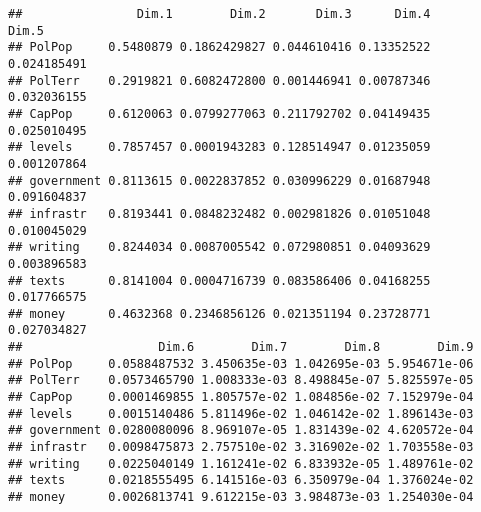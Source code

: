\documentclass[
]{article}
\newenvironment{Shaded}{\begin{snugshade}}{\end{snugshade}}
\newcommand{\NormalTok}[1]{#1}
\newcommand{\OperatorTok}[1]{\textcolor[rgb]{0.81,0.36,0.00}{\textbf{#1}}}
\begin{document}
\begin{verbatim}
##                Dim.1        Dim.2       Dim.3      Dim.4       Dim.5
## PolPop     0.5480879 0.1862429827 0.044610416 0.13352522 0.024185491
## PolTerr    0.2919821 0.6082472800 0.001446941 0.00787346 0.032036155
## CapPop     0.6120063 0.0799277063 0.211792702 0.04149435 0.025010495
## levels     0.7857457 0.0001943283 0.128514947 0.01235059 0.001207864
## government 0.8113615 0.0022837852 0.030996229 0.01687948 0.091604837
## infrastr   0.8193441 0.0848232482 0.002981826 0.01051048 0.010045029
## writing    0.8244034 0.0087005542 0.072980851 0.04093629 0.003896583
## texts      0.8141004 0.0004716739 0.083586406 0.04168255 0.017766575
## money      0.4632368 0.2346856126 0.021351194 0.23728771 0.027034827
##                   Dim.6        Dim.7        Dim.8        Dim.9
## PolPop     0.0588487532 3.450635e-03 1.042695e-03 5.954671e-06
## PolTerr    0.0573465790 1.008333e-03 8.498845e-07 5.825597e-05
## CapPop     0.0001469855 1.805757e-02 1.084856e-02 7.152979e-04
## levels     0.0015140486 5.811496e-02 1.046142e-02 1.896143e-03
## government 0.0280080096 8.969107e-05 1.831439e-02 4.620572e-04
## infrastr   0.0098475873 2.757510e-02 3.316902e-02 1.703558e-03
## writing    0.0225040149 1.161241e-02 6.833932e-05 1.489761e-02
## texts      0.0218555495 6.141516e-03 6.350979e-04 1.376024e-02
## money      0.0026813741 9.612215e-03 3.984873e-03 1.254030e-04
\end{verbatim}

\begin{Shaded}
\end{Shaded}
\end{document}
